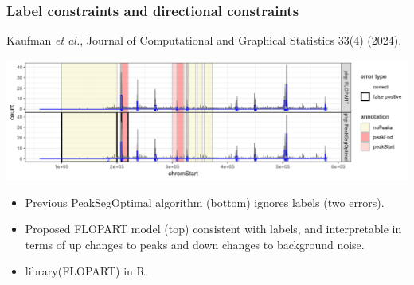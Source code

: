 \documentclass{beamer}
\begin{document}
\begin{frame}
  \frametitle{Label constraints and directional constraints}
   Kaufman \emph{et al.}, Journal of Computational and Graphical Statistics 33(4) (2024).

  \includegraphics[width=\linewidth]{FLOPART-example}

  \begin{itemize}
  \item Previous PeakSegOptimal algorithm (bottom) ignores labels (two
    errors).
  \item Proposed FLOPART model (top) consistent with labels, and
    interpretable in terms of up changes to peaks and down changes to
    background noise.
  \item library(FLOPART) in R.
  \end{itemize}
\end{frame}
\end{document}
